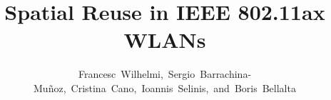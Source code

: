 \documentclass[comsoc]{IEEEtran}
\begin{document}
	\title{Spatial Reuse in IEEE 802.11ax WLANs}

	\author{Francesc~Wilhelmi,~Sergio~Barrachina-Mu\~noz,~Cristina~Cano,~Ioannis~Selinis,~and~Boris~Bellalta}%
	
	
	
	
	
	\maketitle
	
\end{document}

